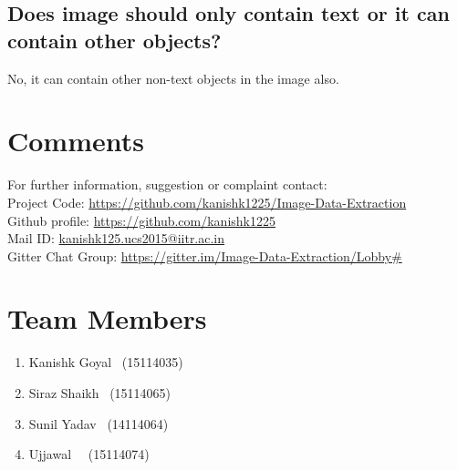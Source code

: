 \documentclass[18 pt]{article}
\begin{document}
\begin{Large}
\begin{flushleft}
\subsection{Does image should only contain text or it can contain other objects?}
No, it can contain other non-text objects in the image also.
\section{Comments} 
For further information, suggestion or complaint contact:\\

Project Code: \href{https://github.com/kanishk1225/Image-Data-Extraction}{https://github.com/kanishk1225/Image-Data-Extraction}\\
Github profile: \href{https://github.com/kanishk1225}{https://github.com/kanishk1225}\\
Mail ID: \href{kanishk125.ucs2015@iitr.ac.in}{kanishk125.ucs2015@iitr.ac.in}\\
Gitter Chat Group: \href{https://gitter.im/Image-Data-Extraction/Lobby\#}{https://gitter.im/Image-Data-Extraction/Lobby\#}\\
\section{Team Members}
\begin{enumerate}
\item Kanishk Goyal \	(15114035)
		
\item Siraz Shaikh 	\	(15114065)
		
\item Sunil Yadav 	\	(14114064)

\item Ujjawal 	\	\	(15114074)
\end{enumerate}



\end{flushleft}
\end{Large}
\end{document}

